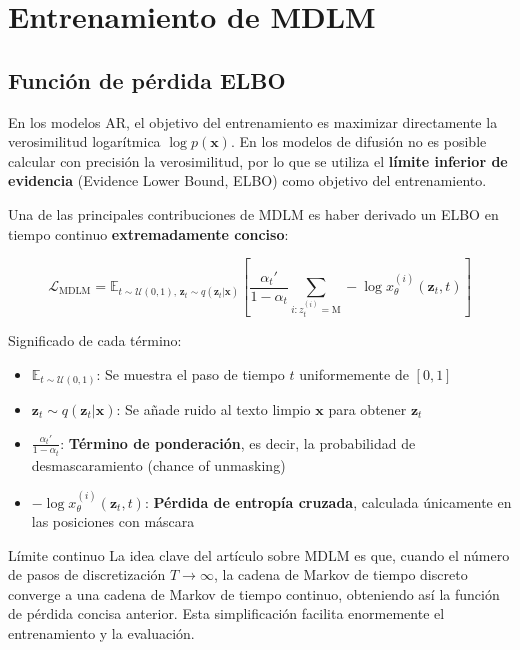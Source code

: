 \section{Entrenamiento de MDLM}

\subsection{Función de pérdida ELBO}

En los modelos AR, el objetivo del entrenamiento es maximizar directamente la verosimilitud logarítmica $\log p(\mathbf{x})$. En los modelos de difusión no es posible calcular con precisión la verosimilitud, por lo que se utiliza el \textbf{límite inferior de evidencia} (Evidence Lower Bound, ELBO) como objetivo del entrenamiento.

Una de las principales contribuciones de MDLM es haber derivado un ELBO en tiempo continuo \textbf{extremadamente conciso}:

$$\mathcal{L}_{\text{MDLM}} = \mathbb{E}_{t \sim \mathcal{U}(0,1), \, \mathbf{z}_t \sim q(\mathbf{z}_t|\mathbf{x})} \left[ \frac{\alpha_t'}{1 - \alpha_t} \sum_{i: z_t^{(i)} = \text{M}} -\log x_\theta^{(i)}(\mathbf{z}_t, t) \right]$$

Significado de cada término:
\begin{itemize}
    \item $\mathbb{E}_{t \sim \mathcal{U}(0,1)}$: Se muestra el paso de tiempo $t$ uniformemente de $[0, 1]$
    \item $\mathbf{z}_t \sim q(\mathbf{z}_t | \mathbf{x})$: Se añade ruido al texto limpio $\mathbf{x}$ para obtener $\mathbf{z}_t$
    \item $\frac{\alpha_t'}{1 - \alpha_t}$: \textbf{Término de ponderación}, es decir, la probabilidad de desmascaramiento (chance of unmasking)
    \item $-\log x_\theta^{(i)}(\mathbf{z}_t, t)$: \textbf{Pérdida de entropía cruzada}, calculada únicamente en las posiciones con máscara
\end{itemize}

\begin{importantbox}{Límite continuo}
La idea clave del artículo sobre MDLM es que, cuando el número de pasos de discretización $T \to \infty$, la cadena de Markov de tiempo discreto converge a una cadena de Markov de tiempo continuo, obteniendo así la función de pérdida concisa anterior. Esta simplificación facilita enormemente el entrenamiento y la evaluación.
\end{importantbox}


